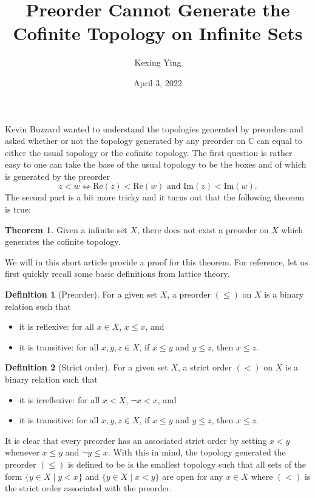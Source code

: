 \documentclass[]{article}
\title{Preorder Cannot Generate the Cofinite Topology on Infinite Sets}
\author{Kexing Ying}
\date{April 3, 2022}
\theoremstyle{definition}
\newtheorem*{theorem*}{Theorem}
\newtheorem*{definition*}{Definition}
\theoremstyle{definition}
\begin{document}
\maketitle

Kevin Buzzard wanted to understand the topologies generated by preorders and asked whether or not 
the topology generated by any preorder on \(\mathbb{C}\) can equal to either the usual topology or the cofinite topology.
The first question is rather easy to one can take the base of the usual topology to be the boxes and of which
is generated by the preorder 
\[z < w \iff \text{Re}(z) < \text{Re}(w) \text{ and } \text{Im}(z) < \text{Im}(w).\]
The second part is a bit more tricky and it turns out that the following theorem is true:
\begin{theorem*}
  Given a infinite set \(X\), there does not exist a preorder on \(X\) which generates the cofinite topology.
\end{theorem*} 
We will in this short article provide a proof for this theorem.
For reference, let us first quickly recall some basic definitions from lattice theory.

\begin{definition*}[Preorder]
  For a given set \(X\), a preorder \((\le)\) on \(X\) is a binary relation such that 
  \begin{itemize}
    \item it is reflexive: for all \(x \in X\), \(x \le x\), and 
    \item it is transitive: for all \(x, y, z \in X\), if \(x \le y\) and \(y \le z\), then \(x \le z\).
  \end{itemize}
\end{definition*}

\begin{definition*}[Strict order]
  For a given set \(X\), a strict order \((<)\) on \(X\) is a binary relation such that 
  \begin{itemize}
    \item it is irreflexive: for all \(x < X\), \(\neg x < x\), and 
    \item it is transitive: for all \(x, y, z \in X\), if \(x \le y\) and \(y \le z\), then \(x \le z\).
  \end{itemize}
\end{definition*}

It is clear that every preorder has an associated strict order by setting \(x < y\) whenever \(x \le y\) and \(\neg y \le x\).
With this in mind, the topology generated the preorder \((\le)\) is defined to be is the smallest topology such that all sets of the 
form \(\{y \in X \mid y < x\}\) and \(\{y \in X \mid x < y\}\) are open for any \(x \in X\) where \((<)\) is the strict 
order associated with the preorder. 
\end{document}
